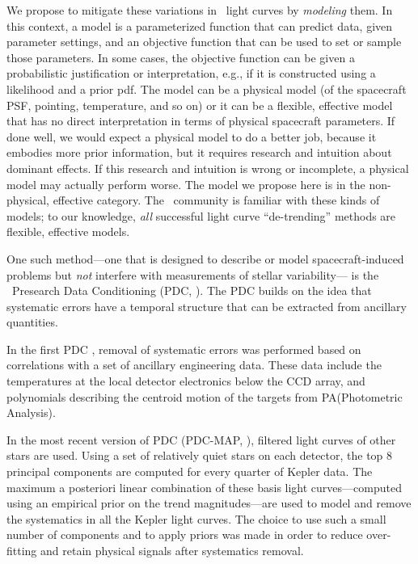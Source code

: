 We propose to mitigate these variations in \Kepler\ light curves by \emph{modeling} them.
In this context, a model is a parameterized function that can predict data, given parameter settings,
  and an objective function that can be used to set or sample those parameters.
In some cases, the objective function can be given a probabilistic justification or interpretation, e.g., if it is constructed using a likelihood and a prior pdf.
The model can be a physical model (of the spacecraft PSF, pointing, temperature, and so on)
  or it can be a flexible, effective model that has no direct interpretation in terms of physical spacecraft parameters.
If done well, we would expect a physical model to do a better job,
  because it embodies more prior information,
  but it requires research and intuition about dominant effects. 
If this research and intuition is wrong or incomplete, a physical model may actually perform worse.
The model we propose here is in the non-physical, effective category.
The \Kepler\ community is familiar with these kinds of models; to our knowledge, \emph{all} successful light curve ``de-trending'' methods are flexible, effective models.

One such method---one that is designed to describe or model spacecraft-induced problems
  but \emph{not} interfere with measurements of stellar variability---%
  is the \Kepler\ Presearch Data Conditioning (PDC, \citealt{pdc1}).
The PDC builds on the idea that systematic errors have a temporal structure that can be extracted from ancillary quantities. 

In the first PDC \citep{pdc1}, removal of systematic errors was performed based on correlations with a set of ancillary engineering data. 
These data include the temperatures at the local detector electronics below the CCD array, and polynomials describing the centroid motion of the targets from PA(Photometric Analysis).

In the most recent version of PDC (PDC-MAP, \citealt{pdc2,pdc3}), filtered light curves of other stars are used. Using a set of relatively quiet stars on each detector, the
top 8 principal components are computed for every quarter of Kepler data. 
The maximum a posteriori linear combination of these basis light curves---computed using an empirical prior on the trend magnitudes---are used to model and remove the systematics in all the Kepler light curves. 
The choice to use such a small number of components and to apply priors was made in order to reduce over-fitting and retain physical signals after systematics removal.

